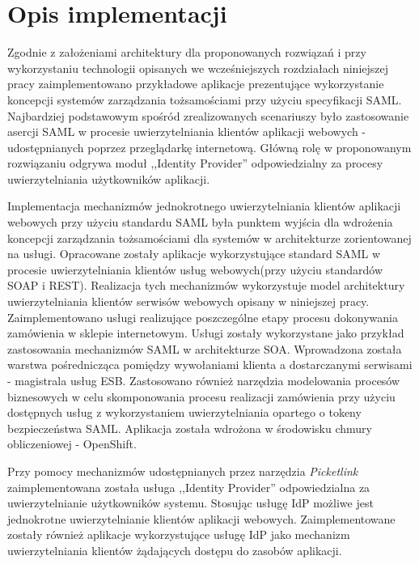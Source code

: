 \chapter{Opis implementacji}
\label{cha:implementacja}

{\it

Zgodnie z założeniami architektury dla proponowanych rozwiązań i przy wykorzystaniu technologii opisanych we wcześniejszych rozdziałach niniejszej pracy zaimplementowano przykładowe aplikacje prezentujące wykorzystanie koncepcji systemów zarządzania tożsamościami przy użyciu specyfikacji SAML. Najbardziej podstawowym spośród zrealizowanych scenariuszy było zastosowanie asercji SAML w procesie uwierzytelniania klientów aplikacji webowych - udostępnianych poprzez przeglądarkę internetową. Główną rolę w proponowanym rozwiązaniu odgrywa moduł ,,Identity Provider'' odpowiedzialny za procesy uwierzytelniania użytkowników aplikacji.

Implementacja mechanizmów jednokrotnego uwierzytelniania klientów aplikacji webowych przy użyciu standardu SAML była punktem wyjścia dla wdrożenia koncepcji zarządzania tożsamościami dla systemów w architekturze zorientowanej na usługi. Opracowane zostały aplikacje wykorzystujące standard SAML w procesie uwierzytelniania klientów usług webowych(przy użyciu standardów SOAP i REST). Realizacja tych mechanizmów wykorzystuje model architektury uwierzytelniania klientów serwisów webowych opisany w niniejszej  pracy. Zaimplementowano usługi realizujące poszczególne etapy procesu dokonywania zamówienia w sklepie internetowym. Usługi zostały wykorzystane jako przykład zastosowania mechanizmów SAML w architekturze SOA. Wprowadzona została warstwa pośrednicząca pomiędzy wywołaniami klienta a dostarczanymi serwisami - magistrala usług ESB. Zastosowano również narzędzia modelowania procesów biznesowych w celu skomponowania procesu realizacji zamówienia przy użyciu dostępnych usług z wykorzystaniem uwierzytelniania opartego o tokeny bezpieczeństwa SAML. Aplikacja została wdrożona w środowisku chmury obliczeniowej - OpenShift.

}



	Przy pomocy mechanizmów udostępnianych przez narzędzia \textit{Picketlink} zaimplementowana została usługa ,,Identity Provider'' odpowiedzialna za uwierzytelnianie użytkowników systemu. Stosując usługę IdP możliwe jest jednokrotne uwierzytelnianie klientów aplikacji webowych. Zaimplementowane zostały również aplikacje wykorzystujące usługę IdP jako mechanizm uwierzytelniania klientów żądających dostępu do zasobów aplikacji.

